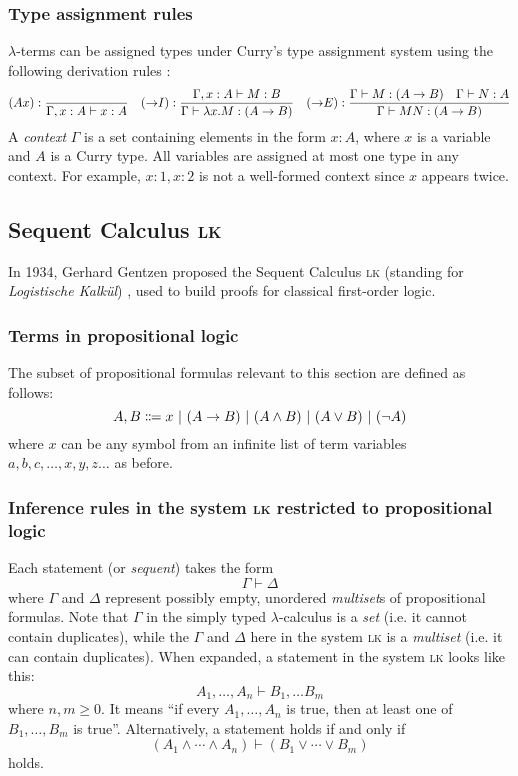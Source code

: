 \subsubsection{Type assignment rules}
\label{lambda:type-assignment}
$\lambda$-terms can be assigned types under Curry's type assignment system using the following derivation rules \cite{van-bakel:2022}:
{
    \derivationfont
    \[
        (Ax): \frac{}{\Gamma, x:A \vdash x:A} \quad (\mathord{\to} I): \frac{\Gamma, x:A \vdash M:B}{\Gamma \vdash \lambda x. M: (A \to B)} \quad (\mathord{\to} E): \frac{\Gamma \vdash M: (A \to B) \quad \Gamma \vdash N: A}{\Gamma \vdash MN: (A \to B)}
    \]
}%
A \textit{context} $\Gamma$ is a set containing elements in the form $x:A$, where $x$ is a variable and $A$ is a Curry type. All variables are assigned at most one type in any context. For example, $x:1, x:2$ is not a well-formed context since $x$ appears twice.

\subsection{Sequent Calculus \textsc{lk}}
In 1934, Gerhard Gentzen proposed the Sequent Calculus \textsc{lk} (standing for \textit{Logistische Kalkül}) \cite{gentzen:1969}, used to build proofs for classical first-order logic.

\subsubsection{Terms in propositional logic}
The subset of propositional formulas relevant to this section are defined as follows:
\[
    A, B \Coloneqq x \ |\  (A \to B) \ |\  (A \land B) \ |\  (A \lor B) \ |\  (\lnot A)
\]
where $x$ can be any symbol from an infinite list of term variables $a, b, c, \ldots, x, y, z \ldots$ as before.

\subsubsection{Inference rules in the system \textsc{lk} restricted to propositional logic}
Each statement (or \textit{sequent}) takes the form
\[
    \Gamma \vdash \Delta
\]
where $\Gamma$ and $\Delta$ represent possibly empty, unordered \textit{multiset}s of propositional formulas. Note that $\Gamma$ in the simply typed $\lambda$-calculus is a \textit{set} (i.e. it cannot contain duplicates), while the $\Gamma$ and $\Delta$ here in the system \textsc{lk} is a \textit{multiset} (i.e. it can contain duplicates). When expanded, a statement in the system \textsc{lk} looks like this:
\[
    A_1, \ldots, A_n \vdash B_1, \ldots B_m
\]
where $n, m \geq 0$. It means ``if every $A_1, \ldots, A_n$ is true, then at least one of $B_1, \ldots, B_m$ is true''. Alternatively, a statement holds if and only if
\[
    (A_1 \land \cdots \land A_n) \vdash (B_1 \lor \cdots \lor B_m)
\]
holds.


